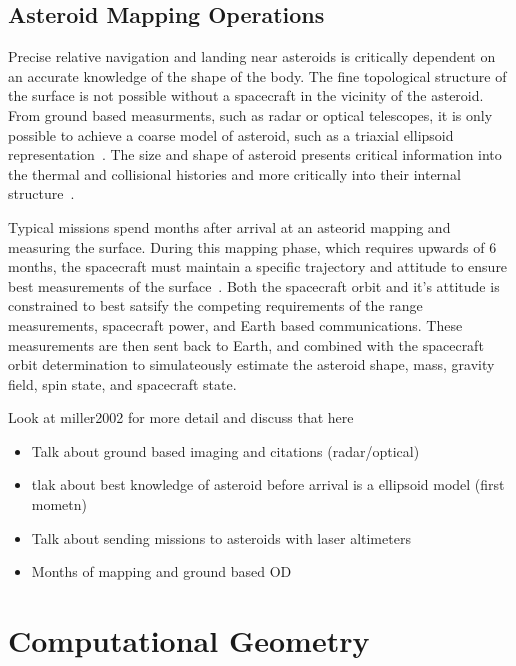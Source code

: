 \subsection{Asteroid Mapping Operations}

Precise relative navigation and landing near asteroids is critically dependent on an accurate knowledge of the shape of the body.
The fine topological structure of the surface is not possible without a spacecraft in the vicinity of the asteroid.
From ground  based measurments, such as radar or optical telescopes, it is only possible to achieve a coarse model of asteroid, such as a triaxial ellipsoid representation~\cite{hudson1994}.
The size and shape of asteroid presents critical information into the thermal and collisional histories and more critically into their internal structure~\cite{cole1998}.

Typical missions spend months after arrival at an asteorid mapping and measuring the surface.
During this mapping phase, which requires upwards of \num{6} months, the spacecraft must maintain a specific trajectory and attitude to ensure best measurements of the surface~\cite{cheng2002,barnouin-jha2008}.
Both the spacecraft orbit and it's attitude is constrained to best satsify the competing requirements of the range measurements, spacecraft power, and Earth based communications.
These measurements are then sent back to Earth, and combined with the spacecraft orbit determination to simulateously estimate the asteroid shape, mass, gravity field, spin state, and spacecraft state.

Look at miller2002 for more detail and discuss that here

\begin{itemize}
    \item Talk about ground based imaging and citations (radar/optical)
    \item tlak about best knowledge of asteroid before arrival is a ellipsoid model (first mometn)
    \item Talk about sending missions to asteroids with laser altimeters
    \item Months of mapping and ground based OD
\end{itemize}

\section{Computational Geometry}

